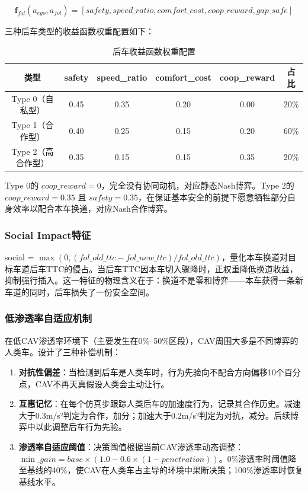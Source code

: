 \begin{equation}
\mathbf{f}_{fol}(a_{ego}, a_{fol}) = [safety, speed\_ratio, comfort\_cost, coop\_reward, gap\_safe]
\end{equation}

三种后车类型的收益函数权重配置如下：

\begin{table}[H]
\centering
\caption{后车收益函数权重配置}
\label{tab:follower_weights}
\small
\begin{tabular}{c|cccc|c}
\hline
类型 & safety & speed\_ratio & comfort\_cost & coop\_reward & 占比 \\
\hline
Type 0（自私型） & 0.45 & 0.35 & 0.20 & 0.00 & 20\% \\
Type 1（合作型） & 0.40 & 0.25 & 0.15 & 0.20 & 60\% \\
Type 2（高合作型） & 0.35 & 0.15 & 0.15 & 0.35 & 20\% \\
\hline
\end{tabular}
\end{table}

Type 0的 $coop\_reward=0$，完全没有协同动机，对应静态Nash博弈。Type 2的 $coop\_reward=0.35$ 且 $safety=0.35$，在保证基本安全的前提下愿意牺牲部分自身效率以配合本车换道，对应Nash合作博弈。

\subsubsection{Social Impact特征}
social = $\max(0, (fol\_old\_ttc - fol\_new\_ttc) / fol\_old\_ttc)$，量化本车换道对目标车道后车TTC的侵占。当后车TTC因本车切入骤降时，正权重降低换道收益，抑制强行插入。这一特征的物理含义在于：换道不是零和博弈——本车获得一条新车道的同时，后车损失了一份安全空间。

\subsubsection{低渗透率自适应机制}
在低CAV渗透率环境下（主要发生在0\%--50\%区段），CAV周围大多是不同博弈的人类车。设计了三种补偿机制：

\begin{enumerate}
    \item \textbf{对抗性偏差}：当检测到后车是人类车时，行为先验向不配合方向偏移10个百分点，CAV不再天真假设人类会主动让行。
    \item \textbf{互惠记忆}：在每个仿真步跟踪人类后车的加速度行为，记录其合作历史。减速大于0.3m/s²判定为合作，加分；加速大于0.2m/s²判定为对抗，减分。后续博弈中以此调整后车行为先验。
    \item \textbf{渗透率自适应阈值}：决策阈值根据当前CAV渗透率动态调整：$\min\_gain = base \times (1.0 - 0.6 \times (1 - penetration))$。0\%渗透率时阈值降至基线的40\%，使CAV在人类车占主导的环境中果断决策；100\%渗透率时恢复基线水平。
\end{enumerate}

